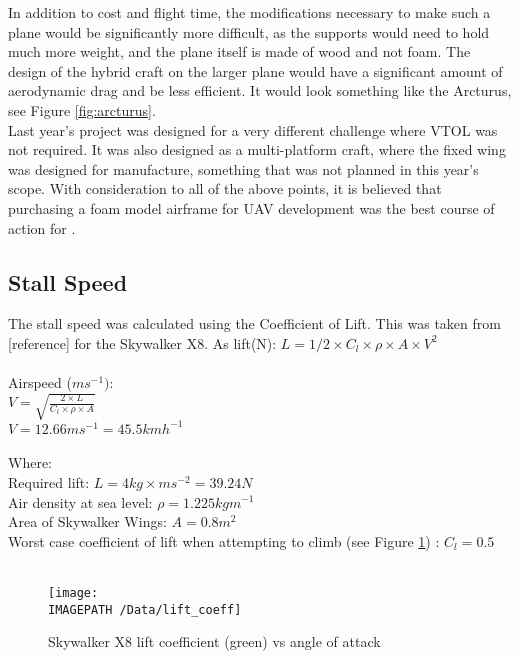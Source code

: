 In addition to cost and flight time, the modifications necessary to make such a plane would be significantly more difficult, as the supports would need to hold much more weight, and the plane itself is made of wood and not foam. The design of the hybrid craft on the larger plane would have a significant amount of aerodynamic drag and be less efficient. It would look something like the Arcturus, see Figure \ref{fig:arcturus}.\\
	
Last year's project was designed for a very different challenge where VTOL was not required. It was also designed as a multi-platform craft, where the fixed wing was designed for manufacture, something that was not planned in this year's scope. With consideration to all of the above points, it is believed that purchasing a foam model airframe for UAV development was the best course of action for \ID.

\subsection{Stall Speed}
\label{sec:stall}
The stall speed was calculated using the Coefficient of Lift. This was taken from [reference] for the Skywalker X8.
As lift(N): $L = 1/2\times C_l\times\rho\times A\times V^2$\\\\
Airspeed ($ms^{-1})$:\\
$V= \sqrt{\frac{2\times L}{C_l\times \rho \times A}}$\\
$V = 12.66ms^{-1} = 45.5kmh^{-1}$\\\\
Where:\\
Required lift: $L = 4kg \times ms^{-2} = 39.24N$\\
Air density at sea level: $\rho = 1.225 kgm^{-1}$\\
Area of Skywalker Wings: $A = 0.8m^2$\\
Worst case coefficient of lift when attempting to climb (see Figure \ref{fig:lift})  
: $C_l = 0.5$
\\\\
\begin{figure}[!ht]
	\centering
	\texttt{[image: \\IMAGEPATH /Data/lift\_coeff]}
	\caption{Skywalker X8 lift coefficient (green) vs angle of attack}
	\label{fig:lift}
\end{figure}


